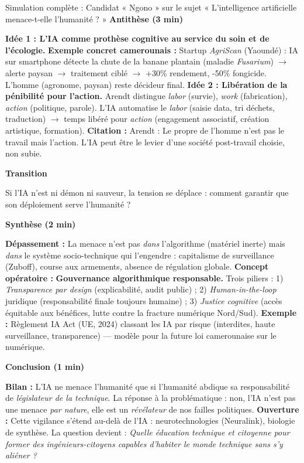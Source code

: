 \documentclass[11pt]{article}
\begin{document}
\begin{exoresolu}{Simulation complète : Candidat « Ngono » sur le sujet « L'intelligence artificielle menace-t-elle l'humanité ? »}
\textbf{Antithèse (3 min)} \par
\og \textbf{Idée 1 : L'IA comme prothèse cognitive au service du soin et de l'écologie.} \textbf{Exemple concret camerounais :} Startup \emph{AgriScan} (Yaoundé) : IA sur smartphone détecte la chute de la banane plantain (maladie \emph{Fusarium}) $\rightarrow$ alerte paysan $\rightarrow$ traitement ciblé $\rightarrow$ +30\% rendement, -50\% fongicide. L'homme (agronome, paysan) reste décideur final. \textbf{Idée 2 : Libération de la pénibilité pour l'action.} Arendt distingue \emph{labor} (survie), \emph{work} (fabrication), \emph{action} (politique, parole). L'IA automatise le \emph{labor} (saisie data, tri déchets, traduction) $\rightarrow$ temps libéré pour \emph{action} (engagement associatif, création artistique, formation). \textbf{Citation :} Arendt : \og Le propre de l'homme n'est pas le travail mais l'action.\fg{} L'IA peut être le levier d'une société post-travail choisie, non subie. \fg{}

\textbf{Transition} \par
\og Si l'IA n'est ni démon ni sauveur, la tension se déplace : comment garantir que son déploiement serve l'humanité ? \fg{}

\textbf{Synthèse (2 min)} \par
\og \textbf{Dépassement :} La menace n'est pas \emph{dans} l'algorithme (matériel inerte) mais \emph{dans} le système socio-technique qui l'engendre : capitalisme de surveillance (Zuboff), course aux armements, absence de régulation globale. \textbf{Concept opératoire :} \textbf{Gouvernance algorithmique responsable.} Trois piliers : 1) \emph{Transparence par design} (explicabilité, audit public) ; 2) \emph{Human-in-the-loop} juridique (responsabilité finale toujours humaine) ; 3) \emph{Justice cognitive} (accès équitable aux bénéfices, lutte contre la fracture numérique Nord/Sud). \textbf{Exemple :} Règlement IA Act (UE, 2024) classant les IA par risque (interdites, haute surveillance, transparence) — modèle pour la future loi camerounaise sur le numérique. \fg{}

\textbf{Conclusion (1 min)} \par
\og \textbf{Bilan :} L'IA ne menace l'humanité que si l'humanité abdique sa responsabilité de \emph{législateur de la technique}. La réponse à la problématique : non, l'IA n'est pas une menace \emph{par nature}, elle est un \emph{révélateur} de nos failles politiques. \textbf{Ouverture :} Cette vigilance s'étend au-delà de l'IA : neurotechnologies (Neuralink), biologie de synthèse. La question devient : \emph{Quelle éducation technique et citoyenne pour former des ingénieurs-citoyens capables d'habiter le monde technique sans s'y aliéner ?} \fg{}


\end{exoresolu}
\end{document}
